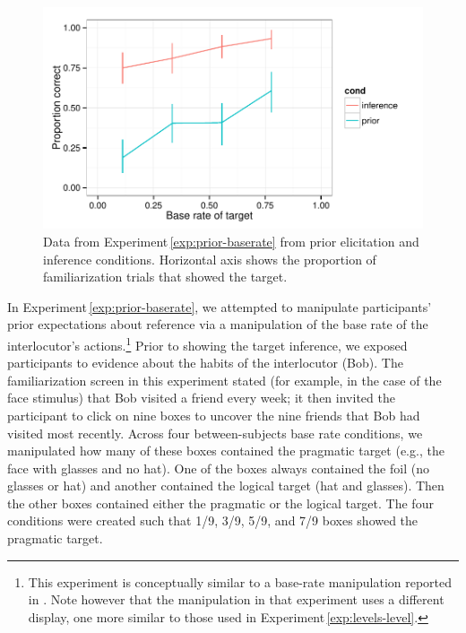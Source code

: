 \documentclass[man,noapacite]{apa2}
\newcounter{Experiment}
\newcommand{\exptref}[1]{Experiment\,\ref{#1}}
\begin{document}
\begin{figure}[t]
  \centering
  \includegraphics[width=5in]{../plots/2-prior-baserates.pdf}
  \caption{\label{fig:prior-baserate} Data from \exptref{exp:prior-baserate} from prior elicitation and inference conditions. Horizontal axis shows the proportion of familiarization trials that showed the target.}
\end{figure}

In \exptref{exp:prior-baserate}, we attempted to manipulate participants' prior expectations about reference via a manipulation of the base rate of the interlocutor's actions.\footnote{This experiment is conceptually similar to a base-rate manipulation reported in . Note however that the manipulation in that experiment uses a different display, one more similar to those used in \exptref{exp:levels-level}.} Prior to showing the target inference, we exposed participants to evidence about the habits of the interlocutor (Bob). The familiarization screen in this experiment stated (for example, in the case of the face stimulus) that Bob visited a friend every week; it then invited the participant to click on nine boxes to uncover the nine friends that Bob had visited most recently. Across four between-subjects base rate conditions, we manipulated how many of these boxes contained the pragmatic target (e.g., the face with glasses and no hat). One of the boxes always contained the foil (no glasses or hat) and another contained the logical target (hat and glasses). Then the other boxes contained either the pragmatic or the logical target. The four conditions were created such that 1/9, 3/9, 5/9, and 7/9 boxes showed the pragmatic target.
\end{document}
